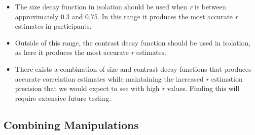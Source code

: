 \documentclass[manuscript, review, anonymous, screen]{acmart}
\providecommand{\tightlist}{%
  \setlength{\itemsep}{0pt}\setlength{\parskip}{0pt}}\usepackage{longtable,booktabs,array}
\begin{document}
\begin{itemize}
\tightlist
\item
  The size decay function in isolation should be used when \emph{r} is
  between approximately 0.3 and 0.75. In this range it produces the most
  accurate \emph{r} estimates in participants.
\item
  Outside of this range, the contrast decay function should be used in
  isolation, as here it produces the most accurate \emph{r} estimates.
\item
  There exists a combination of size and contrast decay functions that
  produces accurate correlation estimates while maintaining the
  increased \emph{r} estimation precision that we would expect to see
  with high \emph{r} values. Finding this will require extensive future
  testing.
\end{itemize}

\hypertarget{sec-combining}{%
\subsection{Combining Manipulations}\label{sec-combining}}
\end{document}

